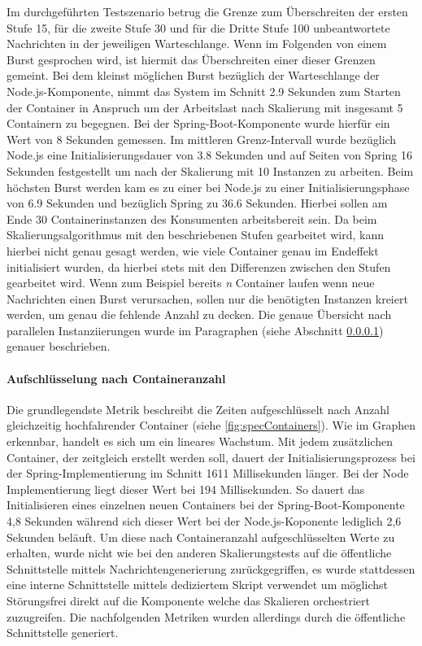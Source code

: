 Im durchgeführten Testszenario betrug die Grenze zum Überschreiten der ersten Stufe 15, für die zweite Stufe 30 und für die Dritte Stufe 100 unbeantwortete Nachrichten in der jeweiligen Warteschlange. Wenn im Folgenden von einem Burst gesprochen wird, ist hiermit das Überschreiten einer dieser Grenzen gemeint. Bei dem kleinst möglichen Burst bezüglich der Warteschlange der Node.js-Komponente, nimmt das System im Schnitt 2.9 Sekunden zum Starten der Container in Anspruch um der Arbeitslast nach Skalierung mit insgesamt 5 Containern zu begegnen. Bei der Spring-Boot-Komponente wurde hierfür ein Wert von 8 Sekunden gemessen. Im mittleren Grenz-Intervall wurde bezüglich Node.js eine Initialisierungsdauer von 3.8 Sekunden und auf Seiten von Spring 16 Sekunden festgestellt um nach der Skalierung mit 10 Instanzen zu arbeiten. Beim höchsten Burst werden kam es zu einer bei Node.js zu einer Initialisierungsphase von 6.9 Sekunden und bezüglich Spring zu 36.6 Sekunden. Hierbei sollen am Ende 30 Containerinstanzen des Konsumenten arbeitsbereit sein. Da beim Skalierungsalgorithmus mit den beschriebenen Stufen gearbeitet wird, kann hierbei nicht genau gesagt werden, wie viele Container genau im Endeffekt initialisiert wurden, da hierbei stets mit den Differenzen zwischen den Stufen gearbeitet wird. Wenn zum Beispiel bereits \emph{n} Container laufen wenn neue Nachrichten einen Burst verursachen, sollen nur die benötigten Instanzen kreiert werden, um genau die fehlende Anzahl zu decken. Die genaue Übersicht nach parallelen Instanziierungen wurde im Paragraphen (siehe Abschnitt \ref{par:specContainer}) genauer beschrieben.


\paragraph{Aufschlüsselung nach Containeranzahl}
\label{par:specContainer}
Die grundlegendste Metrik beschreibt die Zeiten aufgeschlüsselt nach Anzahl gleichzeitig hochfahrender Container (siehe \ref{fig:specContainers}). Wie im Graphen erkennbar, handelt es sich um ein lineares Wachstum. Mit jedem zusätzlichen Container, der zeitgleich erstellt werden soll, dauert der Initialisierungsprozess bei der Spring-Implementierung im Schnitt 1611 Millisekunden länger. Bei der Node Implementierung liegt dieser Wert bei 194 Millisekunden. So dauert das Initialisieren eines einzelnen neuen Containers bei der Spring-Boot-Komponente 4,8 Sekunden während sich dieser Wert bei der Node.js-Koponente lediglich 2,6 Sekunden beläuft. Um diese nach Containeranzahl aufgeschlüsselten Werte zu erhalten, wurde nicht wie bei den anderen Skalierungstests auf die öffentliche Schnittstelle mittels Nachrichtengenerierung zurückgegriffen, es wurde stattdessen eine interne Schnittstelle mittels dediziertem Skript verwendet um möglichst Störungsfrei direkt auf die Komponente welche das Skalieren orchestriert zuzugreifen. Die nachfolgenden Metriken wurden allerdings durch die öffentliche Schnittstelle generiert.

